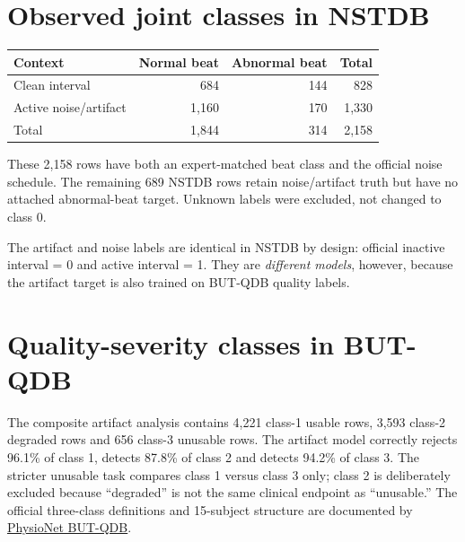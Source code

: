 \documentclass[9pt]{extarticle}
\begin{document}
\section*{Observed joint classes in NSTDB}
\begin{minipage}[t]{0.42\linewidth}
\centering
\scriptsize
\begin{tabular}{@{}lrrr@{}}
\toprule
Context & Normal beat & Abnormal beat & Total \\
\midrule
Clean interval & 684 & 144 & 828 \\
Active noise/artifact & 1,160 & 170 & 1,330 \\
\midrule
Total & 1,844 & 314 & 2,158 \\
\bottomrule
\end{tabular}
\end{minipage}\hfill
\begin{minipage}[t]{0.55\linewidth}\small
These 2,158 rows have both an expert-matched beat class and the official noise schedule. The remaining 689 NSTDB rows retain noise/artifact truth but have no attached abnormal-beat target. Unknown labels were excluded, not changed to class 0.

The artifact and noise labels are identical in NSTDB by design: official inactive interval = 0 and active interval = 1. They are \emph{different models}, however, because the artifact target is also trained on BUT-QDB quality labels.
\end{minipage}

\section*{Quality-severity classes in BUT-QDB}
\small
The composite artifact analysis contains 4,221 class-1 usable rows, 3,593 class-2 degraded rows and 656 class-3 unusable rows. The artifact model correctly rejects 96.1\% of class 1, detects 87.8\% of class 2 and detects 94.2\% of class 3. The stricter unusable task compares class 1 versus class 3 only; class 2 is deliberately excluded because ``degraded'' is not the same clinical endpoint as ``unusable.'' The official three-class definitions and 15-subject structure are documented by \href{https://physionet.org/content/butqdb/1.0.0/}{PhysioNet BUT-QDB}.
\end{document}
